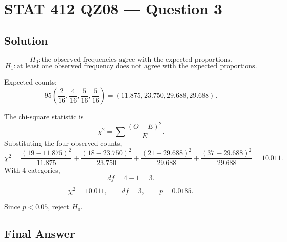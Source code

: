 \documentclass[11pt]{article}
\begin{document}
\section*{STAT 412 QZ08 --- Question 3}

\subsection*{Solution}

\[
H_0:\text{the observed frequencies agree with the expected proportions.}
\]
\[
H_1:\text{at least one observed frequency does not agree with the expected proportions.}
\]

Expected counts:
\[
95\left(\frac{2}{16},\frac{4}{16},\frac{5}{16},\frac{5}{16}\right)
=(11.875,23.750,29.688,29.688).
\]

The chi-square statistic is
\[
\chi^2=\sum\frac{(O-E)^2}{E}.
\]
Substituting the four observed counts,
\[
\chi^2=
\frac{(19-11.875)^2}{11.875}
+\frac{(18-23.750)^2}{23.750}
+\frac{(21-29.688)^2}{29.688}
+\frac{(37-29.688)^2}{29.688}
=10.011.
\]
With \(4\) categories,
\[
df=4-1=3.
\]

\[
\chi^2=10.011,\qquad df=3,\qquad p=0.0185.
\]

Since \(p<0.05\), reject \(H_0\).

\subsection*{Final Answer}

\end{document}
